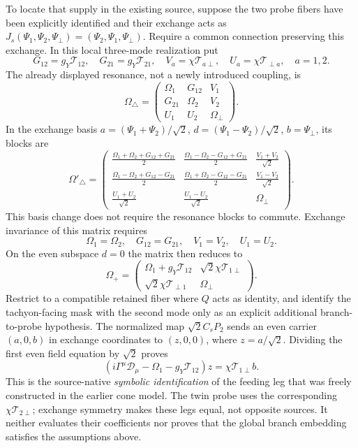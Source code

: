 \documentclass[11pt,a4paper]{article}
\begin{document}
To locate that supply in the existing source, suppose the two probe
fibers have been explicitly identified and their exchange acts as
$J_s(\Psi_1,\Psi_2,\Psi_\perp)=(\Psi_2,\Psi_1,\Psi_\perp)$.
Require a common connection preserving this exchange. In this local
three-mode realization put
\[
 G_{12}=g_Y\mathcal T_{12},\quad G_{21}=g_Y\mathcal T_{21},
 \quad V_a=\chi\mathcal T_{a\perp},\quad
 U_a=\chi\mathcal T_{\perp a},
 \quad a=1,2.
\]
The already displayed resonance, not a newly introduced coupling,
is
\[
 \Omega_\triangle=
 \begin{pmatrix}\Omega_1&G_{12}&V_1\\
 G_{21}&\Omega_2&V_2\\U_1&U_2&\Omega_\perp\end{pmatrix}.
\]
In the exchange basis
$a=(\Psi_1+\Psi_2)/\sqrt2$,
$d=(\Psi_1-\Psi_2)/\sqrt2$, $b=\Psi_\perp$, its blocks are
\[
 \Omega'_\triangle=
 \begin{pmatrix}
 \frac{\Omega_1+\Omega_2+G_{12}+G_{21}}2&
 \frac{\Omega_1-\Omega_2-G_{12}+G_{21}}2&
 \frac{V_1+V_2}{\sqrt2}\\[2pt]
 \frac{\Omega_1-\Omega_2+G_{12}-G_{21}}2&
 \frac{\Omega_1+\Omega_2-G_{12}-G_{21}}2&
 \frac{V_1-V_2}{\sqrt2}\\[2pt]
 \frac{U_1+U_2}{\sqrt2}&\frac{U_1-U_2}{\sqrt2}&\Omega_\perp
 \end{pmatrix}.
\]
This basis change does not require the resonance blocks to commute.
Exchange invariance of this matrix requires
\[
 \Omega_1=\Omega_2,\quad G_{12}=G_{21},\quad
 V_1=V_2,\quad U_1=U_2.
\]
On the even subspace $d=0$ the matrix then reduces to
\[
 \Omega_+=
 \begin{pmatrix}
  \Omega_1+g_Y\mathcal T_{12}&\sqrt2\chi\mathcal T_{1\perp}\\
  \sqrt2\chi\mathcal T_{\perp1}&\Omega_\perp
 \end{pmatrix}.
\]
Restrict to a compatible retained fiber where $Q$ acts as identity,
and identify the tachyon-facing mask with the second mode only
as an explicit additional branch-to-probe hypothesis. The normalized
map $\sqrt2 C_sP_2$ sends an even carrier $(a,0,b)$ in exchange
coordinates to $(z,0,0)$, where $z=a/\sqrt2$. Dividing the first
even field equation by $\sqrt2$ proves
\[
 \boxed{\displaystyle
 (i\Gamma^\mu\mathcal D_\mu-
       \Omega_1-g_Y\mathcal T_{12})z
       =\chi\mathcal T_{1\perp}b.}
\]
This is the source-native \emph{symbolic identification} of the
feeding leg that was freely constructed in the earlier cone model.
The twin probe uses the corresponding $\chi\mathcal T_{2\perp}$;
exchange symmetry makes these legs equal, not opposite sources.
It neither evaluates their coefficients nor proves that the global
branch embedding satisfies the assumptions above.
\end{document}
